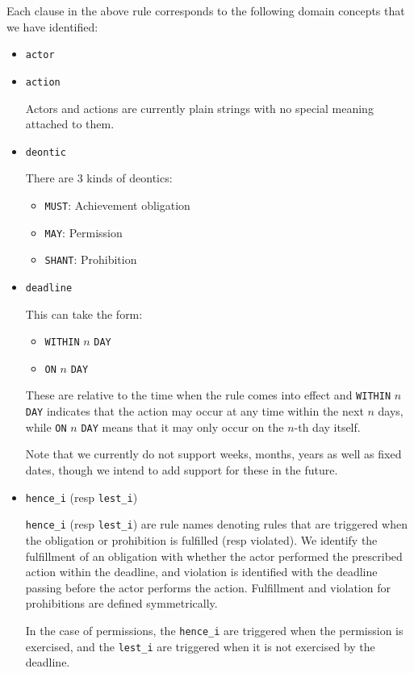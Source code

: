 \documentclass{article}
\begin{document}
Each clause in the above rule corresponds to the following
domain concepts that we have identified:
\begin{itemize}
  \item \texttt{actor}
  \item \texttt{action}

  Actors and actions are currently plain strings with no special meaning
  attached to them.
  
  \item \texttt{deontic}

  There are 3 kinds of deontics:
  \begin{itemize}
    \item \texttt{MUST}: Achievement obligation
    \item \texttt{MAY}: Permission
    \item \texttt{SHANT}: Prohibition
  \end{itemize}

  \item \texttt{deadline}

  This can take the form:
  \begin{itemize}
    \item \texttt{WITHIN} $n$ \texttt{DAY}
    \item \texttt{ON} $n$ \texttt{DAY}
  \end{itemize}

  These are relative to the time when the rule comes into effect and
  \texttt{WITHIN} $n$ \texttt{DAY} indicates that the action may occur at any
  time within the next $n$ days, while \texttt{ON} $n$ \texttt{DAY} means that it
  may only occur on the $n$-th day itself.

  Note that we currently do not support weeks, months, years as well as fixed
  dates, though we intend to add support for these in the future.

  \item \texttt{hence\_i} (resp \texttt{lest\_i})

  \texttt{hence\_i} (resp \texttt{lest\_i}) are rule names denoting rules that
  are triggered when the obligation or prohibition is fulfilled (resp violated).
  We identify the fulfillment of an obligation with whether the actor performed
  the prescribed action within the deadline, and violation is identified with
  the deadline passing before the actor performs the action.
  Fulfillment and violation for prohibitions are defined symmetrically.

  In the case of permissions, the \texttt{hence\_i} are triggered when the
  permission is exercised, and the \texttt{lest\_i} are triggered when it
  is not exercised by the deadline. 
\end{itemize}
\end{document}
